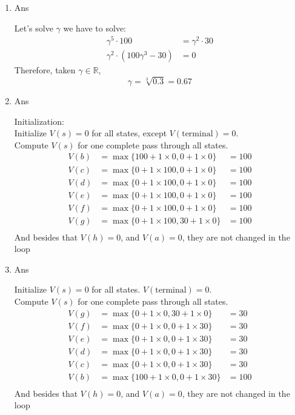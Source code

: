 \documentclass[12pt]{article}
\begin{document}
\begin{enumerate}
\begin{enumerate}
    \item Ans
    \begin{tcolorbox}
        Let's solve \(\gamma\) 
        we have to solve:
        \begin{align*}
            \gamma^{5} \cdot 100 &=  \gamma^{2} \cdot 30 \\
            \gamma^{2} \cdot (100\gamma^{3} - 30) &= 0 
        \end{align*}
        Therefore, taken \(\gamma \in \mathbb{R}\),
        \[
        \gamma = \sqrt[3]{0.3} = 0.67
        \]
    \end{tcolorbox}
    \item Ans
    \begin{tcolorbox}
        Initialization:\\
        Initialize $V(s)=0$ for all states, except $V(\text{terminal}) = 0$.\\
        Compute $V(s)$ for one complete pass through all states.\\
        \begin{align*}    
            V(b) &= \max\{100 + 1 \times 0, 0 + 1 \times 0\} &= 100\\
            V(c) &= \max\{0 + 1 \times 100, 0 + 1 \times 0\} &= 100\\
            V(d) &= \max\{0 + 1 \times 100, 0 + 1 \times 0\} &= 100\\
            V(e) &= \max\{0 + 1 \times 100, 0 + 1 \times 0\} &= 100\\
            V(f) &= \max\{0 + 1 \times 100, 0 + 1 \times 0\} &= 100\\
            V(g) &= \max\{0 + 1 \times 100, 30 + 1 \times 0\} &= 100\\     
        \end{align*}
        And besides that \(V(h) = 0\), and \(V(a) = 0\), they are not changed in the loop
    \end{tcolorbox}
    \item Ans
    \begin{tcolorbox}
        Initialize $V(s)=0$ for all states. \(V(\text{terminal}) = 0\).\\
        Compute $V(s)$ for one complete pass through all states.\\
        \begin{align*}    
            V(g) &= \max\{0 + 1 \times 0, 30 + 1 \times 0\} &= 30\\
            V(f) &= \max\{0 + 1 \times 0, 0 + 1 \times 30\} &= 30\\
            V(e) &= \max\{0 + 1 \times 0, 0 + 1 \times 30\} &= 30\\
            V(d) &= \max\{0 + 1 \times 0, 0 + 1 \times 30\} &= 30\\
            V(c) &= \max\{0 + 1 \times 0, 0 + 1 \times 30\} &= 30\\
            V(b) &= \max\{100 + 1 \times 0, 0 + 1 \times 30\} &= 100\\     
        \end{align*}
        And besides that \(V(h) = 0\), and \(V(a) = 0\), they are not changed in the loop
    \end{tcolorbox}
    

\end{enumerate}
\end{enumerate}
\end{document}
